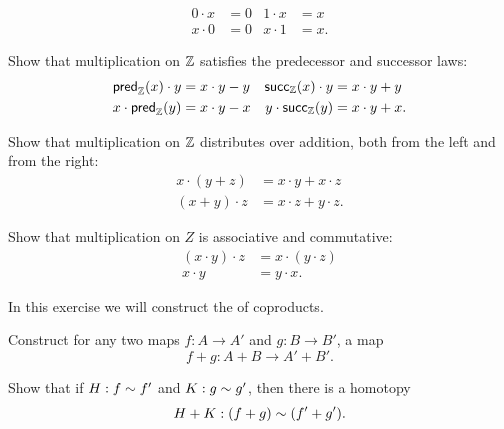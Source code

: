 \begin{exercises}
\begin{subexenum}
    \begin{align*}
      0\cdot x & = 0 & 1\cdot x & = x \\
      x\cdot 0 & = 0 & x\cdot 1 & = x.
    \end{align*}
  \item Show that multiplication on ${\mathbb{Z}}$ satisfies the predecessor and successor laws:
    \begin{align*}
      \mathsf{pred}_{{\mathbb{Z}}}(x)\cdot y & = x\cdot y-y & \mathsf{succ}_{{\mathbb{Z}}}(x)\cdot y & = x\cdot y + y \\
      x\cdot \mathsf{pred}_{{\mathbb{Z}}}(y) & = x\cdot y-x & y\cdot \mathsf{succ}_{{\mathbb{Z}}}(y) & = x\cdot y + x.
    \end{align*}
  \item Show that multiplication on ${\mathbb{Z}}$ distributes over addition, both from the left and from the right:
    \begin{align*}
      x\cdot(y+z) & = x\cdot y+ x\cdot z \\
      (x+y)\cdot z & = x\cdot z + y\cdot z.
    \end{align*}
  \item Show that multiplication on $Z$ is associative and commutative:
    \begin{align*}
      (x\cdot y)\cdot z & = x\cdot (y\cdot z) \\
      x\cdot y & = y\cdot x.
    \end{align*}
  \end{subexenum}
  \exercise \label{ex:coproduct_functor}In this exercise we will construct the  of coproducts.
  \begin{subexenum}
  \item Construct for any two maps $f:A \to A'$ and $g:B \to B'$, a map
    \begin{equation*}
      f+g:A+B \to A'+B'.
    \end{equation*}
  \item Show that if $H:f\sim f'$ and $K:g\sim g'$, then there is a homotopy
    \begin{equation*}
      H+K:(f+g)\htpy (f'+g').

\end{equation*}
\end{subexenum}
\end{exercises}
